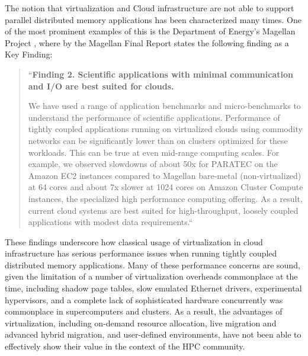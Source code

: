 The notion that virtualization and Cloud infrastructure are not able to support parallel distributed memory applications has been characterized many times. One of the most prominent examples of this is the Department of Energy's Magellan Project \cite{www-magellan}, where by the Magellan Final Report \cite{MagellanFinal} states the following finding as a Key Finding:
  
\begin{quote}
``\textbf{Finding 2. Scientific applications with minimal communication and I/O are best suited for
clouds.}

We have used a range of application benchmarks and micro-benchmarks to understand the performance of scientific applications. Performance of tightly coupled applications running on virtualized clouds using commodity networks can be significantly lower than on clusters optimized for these workloads. This can be true at even mid-range computing scales. For example, we observed slowdowns of about 50x for PARATEC on the Amazon EC2 instances compared to Magellan bare-metal (non-virtualized) at 64 cores and about 7x slower at 1024 cores on Amazon Cluster Compute instances, the specialized high performance computing offering. As a result, current cloud systems are best suited for high-throughput, loosely coupled applications with modest data requirements.``
\end{quote}

These findings underscore how classical usage of virtualization in cloud infrastructure has serious performance issues when running tightly coupled distributed memory applications. Many of these performance concerns are sound, given the limitation of a number of virtualization overheads commonplace at the time, including shadow page tables, slow emulated Ethernet drivers, experimental hypervisors, and a complete lack of sophisticated hardware concurrently was commonplace in supercomputers and clusters.  As a result, the advantages of virtualization, including on-demand resource allocation, live migration and advanced hybrid migration, and user-defined environments, have not been able to effectively show their value in the context of the HPC community.

